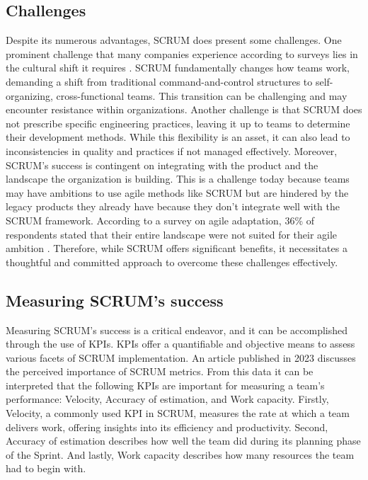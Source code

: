 \subsection{Challenges}
Despite its numerous advantages, SCRUM does present some challenges.
One prominent challenge that many companies experience according to surveys 
lies in the cultural shift it requires \parencite{AgileTransformationSurvey}.
SCRUM fundamentally changes how teams work, demanding a shift from 
traditional command-and-control structures to self-organizing, cross-functional teams. 
This transition can be challenging and may encounter resistance within organizations. 
Another challenge is that SCRUM does not prescribe specific engineering practices, 
leaving it up to teams to determine their development methods.
While this flexibility is an asset, it can also lead to inconsistencies 
in quality and practices if not managed effectively.
Moreover, SCRUM's success is contingent on integrating with the product and the landscape 
the organization is building. This is a challenge today because teams may have ambitions to 
use agile methods like SCRUM but are hindered by the legacy products they already have because they don't integrate well with the SCRUM framework. 
According to a survey on agile adaptation, 36\% of respondents stated that their entire landscape
were not suited for their agile ambition \parencite{AgileTransformationSurvey}.
Therefore, while SCRUM offers significant benefits, 
it necessitates a thoughtful and committed approach to overcome these challenges effectively.

\subsection{Measuring SCRUM's success}
Measuring SCRUM's success is a critical endeavor, and it can be accomplished through the use of KPIs.
KPIs offer a quantifiable and objective means to assess various facets of SCRUM implementation. 
An article published in 2023 \parencite{PercPerfOfMetrForAgileScrumEnv} discusses the perceived importance 
of SCRUM metrics. 
From this data it can be interpreted that the following KPIs are 
important for measuring a team's performance: Velocity, 
Accuracy of estimation, and Work capacity. Firstly, Velocity, a commonly used KPI in SCRUM, 
measures the rate at which a team delivers work, offering insights into its efficiency and productivity. 
Second, Accuracy of estimation describes how well the team did during its planning phase of the Sprint. 
And lastly, Work capacity describes how many resources the team had to begin with.

